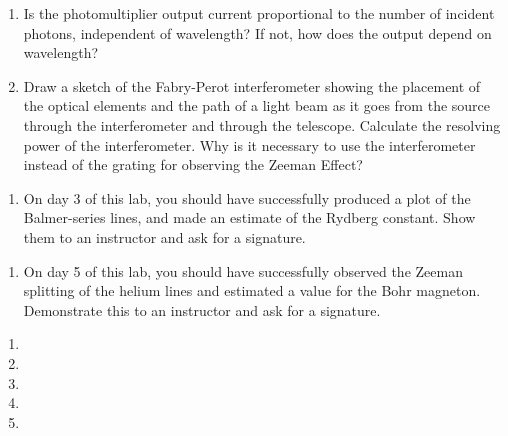 \documentclass{../signatures}
\begin{document}
\begin{enumerate}
    \item Is the photomultiplier output current proportional to the number of incident photons, independent of wavelength? If not, how does the output depend on wavelength?

    \item Draw a sketch of the Fabry-Perot interferometer showing the placement of the optical elements and the path of a light beam as it goes from the source through the interferometer and through the telescope. Calculate the resolving power of the interferometer. Why is it necessary to use the interferometer instead of the grating for observing the Zeeman Effect?
       \\[36pt]
\end{enumerate}

\prelabsignatures

\midlab

\begin{enumerate}

    \item On day 3 of this lab, you should have successfully produced a plot of the Balmer-series lines, and made an estimate of the Rydberg constant. Show them to an instructor and ask for a signature. 
\\[36pt]
\end{enumerate}


\begin{enumerate}

\item On day 5 of this lab, you should have successfully observed the Zeeman splitting of the helium lines and estimated a value for the Bohr magneton. Demonstrate this to an instructor and ask for a signature.
\\[36pt]
\end{enumerate}


\checkpointsection 

\begin{enumerate}

\item {}

\item {}

\item {}

\item {}

\item {}

\end{enumerate}
\end{document}
